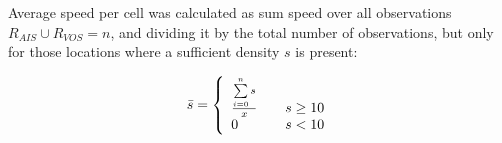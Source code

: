 Average speed per cell was calculated as sum speed over all observations $R_{AIS} \cup R_{VOS} = n$, and dividing it by the total number of observations, but only for those locations where a sufficient density $s$ is present: 

\begin{equation}
 \bar{s} = \left\{
   \begin{array}{l l}
    \frac{\sum\limits_{i=0}^n s}{x} & \quad \text{$s \ge 10$}\\
    0 & \quad \text {$s < 10$}
   \end{array}\right.
\end{equation}







